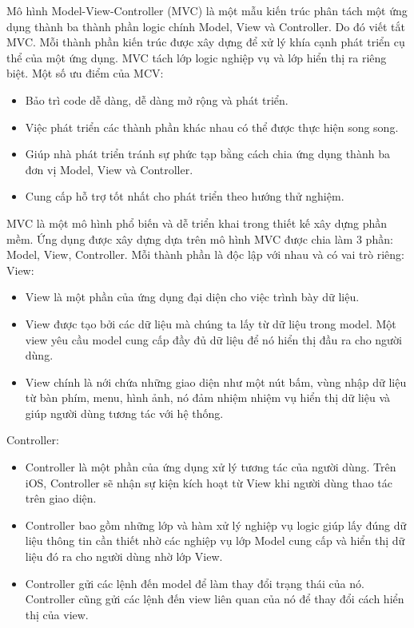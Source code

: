 \documentclass[../DoAn.tex]{subfiles}
\begin{document}
Mô hình Model-View-Controller (MVC) là một mẫu kiến trúc phân tách một ứng dụng thành ba thành phần logic chính Model, View và Controller. Do đó viết tắt MVC. Mỗi thành phần kiến trúc được xây dựng để xử lý khía cạnh phát triển cụ thể của một ứng dụng. MVC tách lớp logic nghiệp vụ và lớp hiển thị ra riêng biệt. Một số ưu điểm của MCV:
\begin{itemize}
    \item Bảo trì code dễ dàng, dễ dàng mở rộng và phát triển.
    \item Việc phát triển các thành phần khác nhau có thể được thực hiện song song.
    \item Giúp nhà phát triển tránh sự phức tạp bằng cách chia ứng dụng thành ba đơn vị Model, View và Controller.
    \item Cung cấp hỗ trợ tốt nhất cho phát triển theo hướng thử nghiệm.
\end{itemize}
MVC là một mô hình phổ biến và dễ triển khai trong thiết kế xây dựng phần mềm. Ứng dụng được xây dựng dựa trên mô hình MVC được chia làm 3 phần: Model, View, Controller. Mỗi thành phần là độc lập với nhau và có vai trò riêng:
\newline
View:
\begin{itemize}
    \item View là một phần của ứng dụng đại diện cho việc trình bày dữ liệu.
    \item View được tạo bởi các dữ liệu mà chúng ta lấy từ dữ liệu trong model. Một view yêu cầu model cung cấp đầy đủ dữ liệu để nó hiển thị đầu ra cho người dùng.
    \item View chính là nới chứa những giao diện như một nút bấm, vùng nhập dữ liệu từ bàn phím, menu, hình ảnh, nó đảm nhiệm nhiệm vụ hiển thị dữ liệu và giúp người dùng tương tác với hệ thống.
\end{itemize}
Controller:
\begin{itemize}
    \item Controller là một phần của ứng dụng xử lý tương tác của người dùng. Trên iOS, Controller sẽ nhận sự kiện kích hoạt từ View khi người dùng thao tác trên giao diện.
    \item Controller bao gồm những lớp và hàm xử lý nghiệp vụ logic giúp lấy đúng dữ liệu thông tin cần thiết nhờ các nghiệp vụ lớp Model cung cấp và hiển thị dữ liệu đó ra cho người dùng nhờ lớp View.
    \item Controller gửi các lệnh đến model để làm thay đổi trạng thái của nó. Controller cũng gửi các lệnh đến view liên quan của nó để thay đổi cách hiển thị của view.
\end{itemize}
\end{document}
